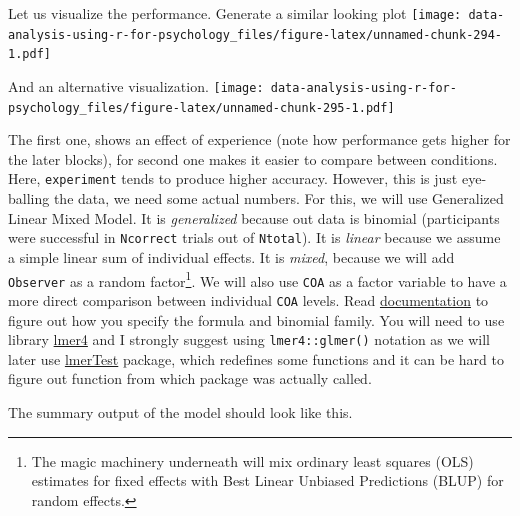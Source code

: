 \documentclass[
]{book}
\begin{document}
Let us visualize the performance. Generate a similar looking plot
\texttt{[image: data-analysis-using-r-for-psychology\_files/figure-latex/unnamed-chunk-294-1.pdf]}

And an alternative visualization.
\texttt{[image: data-analysis-using-r-for-psychology\_files/figure-latex/unnamed-chunk-295-1.pdf]}

The first one, shows an effect of experience (note how performance gets higher for the later blocks), for second one makes it easier to compare between conditions. Here, \texttt{experiment} tends to produce higher accuracy. However, this is just eye-balling the data, we need some actual numbers. For this, we will use Generalized Linear Mixed Model. It is \emph{generalized} because out data is binomial (participants were successful in \texttt{Ncorrect} trials out of \texttt{Ntotal}). It is \emph{linear} because we assume a simple linear sum of individual effects. It is \emph{mixed}, because we will add \texttt{Observer} as a random factor\footnote{The magic machinery underneath will mix ordinary least squares (OLS) estimates for fixed effects with Best Linear Unbiased Predictions (BLUP) for random effects.}. We will also use \texttt{COA} as a factor variable to have a more direct comparison between individual \texttt{COA} levels. Read \href{https://www.rdocumentation.org/packages/lme4/versions/1.1-26/topics/glmer}{documentation} to figure out how you specify the formula and binomial family. You will need to use library \href{https://github.com/lme4/lme4}{lmer4} and I strongly suggest using \texttt{lmer4::glmer()} notation as we will later use \href{}{lmerTest} package, which redefines some functions and it can be hard to figure out function from which package was actually called.

The summary output of the model should look like this.
\end{document}
